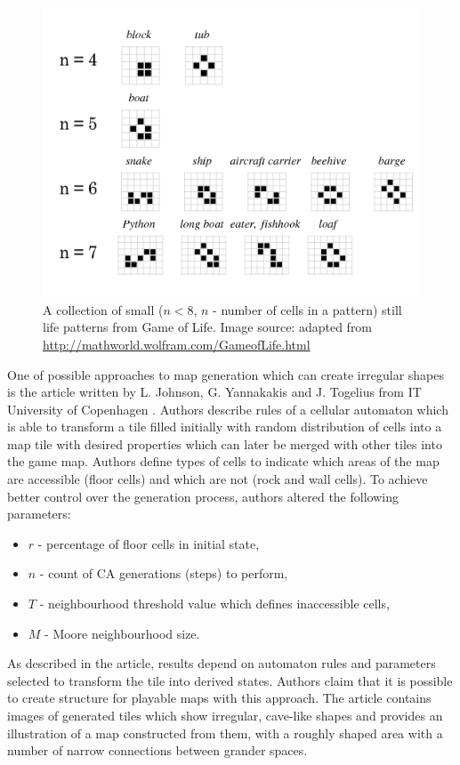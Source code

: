 \documentclass[12pt]{report}
\begin{document}
\begin{figure}[h]
	\centering
	\includegraphics[width=0.6\linewidth]{images/stilllife}
	\caption{A collection of small ($n<8$, $n$ - number of cells in a pattern) still life patterns from Game of Life. Image source: adapted from \url{http://mathworld.wolfram.com/GameofLife.html}}
	\label{fig:stilllife}
\end{figure}


One of possible approaches to map generation which can create irregular shapes is the article written by L. Johnson, G. Yannakakis and J. Togelius from IT University of Copenhagen \autocite{johnson2010cellular}. Authors describe rules of a cellular automaton which is able to transform a tile filled initially with random distribution of cells into a map tile with desired properties which can later be merged with other tiles into the game map. Authors define types of cells to indicate which areas of the map are accessible (floor cells) and which are not (rock and wall cells). To achieve better control over the generation process, authors altered the following parameters: 

\begin{itemize}
	\item $r$ - percentage of floor cells in initial state,
	\item $n$ - count of CA generations (steps) to perform,
	\item $T$ - neighbourhood threshold value which defines inaccessible cells, 
	\item $M$ - Moore neighbourhood size.
\end{itemize}

As described in the article, results depend on automaton rules and parameters selected to transform the tile into derived states. Authors claim that it is possible to create structure for playable maps with this approach. The article contains images of generated tiles which show irregular, cave-like shapes and provides an illustration of a map constructed from them, with a roughly shaped area with a number of narrow connections between grander spaces. 
\end{document}
